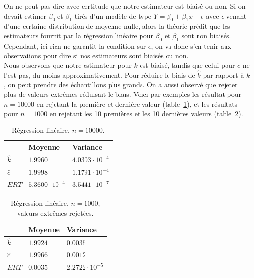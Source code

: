 On ne peut pas dire avec certitude que notre estimateur est biaisé ou non. Si on devait estimer $\beta_0$ et $\beta_1$ tirés d'un modèle de type $Y = \beta_0 + \beta_1x + \epsilon$ avec $\epsilon$ venant d'une certaine distribution de moyenne nulle, alors la théorie prédit que les estimateurs fournit par la régression linéaire pour $\beta_0$ et $\beta_1$ sont non biaisés. Cependant, ici rien ne garantit la condition sur $\epsilon$, on va donc s'en tenir aux observations pour dire si nos estimateurs sont biaisés ou non.\\
Nous observons que notre estimateur pour $k$ est biaisé, tandis que celui pour $c$ ne l'est pas, du moins approximativement. Pour réduire le biais de $\hat{k}$ par rapport à $k$, on peut prendre des échantillons plus grands. On a aussi observé que rejeter plus de valeurs extrêmes réduisait le biais. Voici par exemples les résultat pour $n=10000$ en rejetant la première et dernière valeur (table~\ref{table:reg2}), et les résultats pour $n=1000$ en rejetant les 10 premières et les 10 dernières valeurs (table~\ref{table:reg10}).

\begin{table}[!ht]
\centering
\begin{tabular}{|l|l|l|}
\hline
				& Moyenne 	& Variance\\
\hline
$\hat{k}$ 	& $1.9960$ 	& $4.0303\cdot10^{-4}$\\
$\hat{c}$ 	& $1.9998$ 	& $1.1791\cdot10^{-4}$\\
$ERT$		& $5.3600\cdot10^{-4}$	& $3.5441\cdot 10^{-7}$\\
\hline
\end{tabular}
\caption{Régression linéaire, $n=10000$.}
\label{table:reg2}
\end{table}

\begin{table}[!ht]
\centering
\begin{tabular}{|l|l|l|}
\hline
				& Moyenne 	& Variance\\
\hline
$\hat{k}$ 	& $1.9924$ 	& $0.0035$\\
$\hat{c}$ 	& $1.9966$ 	& $0.0012$\\
$ERT$		& $0.0035$	& $2.2722\cdot 10^{-5}$\\
\hline
\end{tabular}
\caption{Régression linéaire, $n=1000$, valeurs extrêmes rejetées.}
\label{table:reg10}
\end{table}

